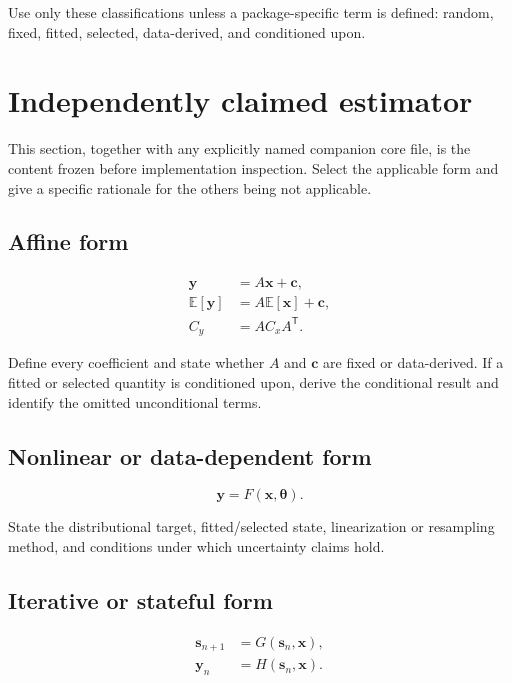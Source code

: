 \documentclass[11pt]{article}
\newcommand{\E}{\mathbb{E}}
\begin{document}
Use only these classifications unless a package-specific term is defined:
random, fixed, fitted, selected, data-derived, and conditioned upon.

\section{Independently claimed estimator}
\label{sec:independent-core}

This section, together with any explicitly named companion core file, is the
content frozen before implementation inspection. Select the applicable form
and give a specific rationale for the others being not applicable.

\subsection{Affine form}

\begin{align}
  \boldsymbol y &= A\boldsymbol x+\boldsymbol c,
  \label{eq:affine}\\
  \E[\boldsymbol y] &= A\E[\boldsymbol x]+\boldsymbol c,
  \label{eq:affine-mean}\\
  C_y &= A C_x A^{\mathsf T}.
  \label{eq:affine-cov}
\end{align}

Define every coefficient and state whether \(A\) and \(\boldsymbol c\) are
fixed or data-derived. If a fitted or selected quantity is conditioned upon,
derive the conditional result and identify the omitted unconditional terms.

\subsection{Nonlinear or data-dependent form}

\begin{equation}
  \boldsymbol y=F(\boldsymbol x,\boldsymbol\theta).
  \label{eq:nonlinear}
\end{equation}

State the distributional target, fitted/selected state, linearization or
resampling method, and conditions under which uncertainty claims hold.

\subsection{Iterative or stateful form}

\begin{align}
  \boldsymbol s_{n+1} &= G(\boldsymbol s_n,\boldsymbol x),
  \label{eq:state-update}\\
  \boldsymbol y_n &= H(\boldsymbol s_n,\boldsymbol x).
  \label{eq:state-output}
\end{align}
\end{document}
